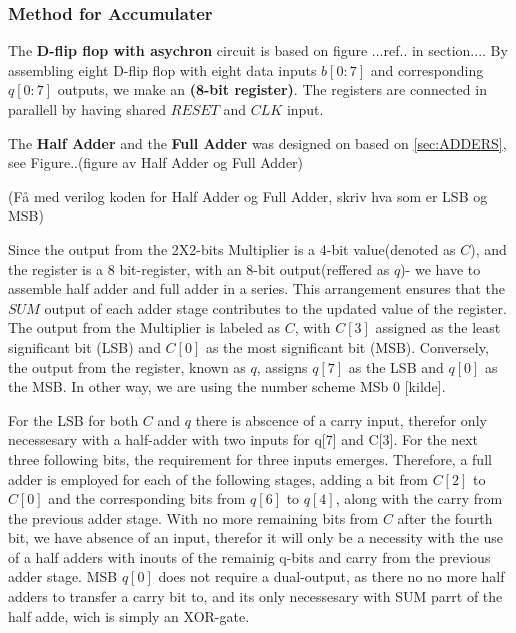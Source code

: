 \subsubsection{Method for Accumulater}

The \textbf{D-flip flop with asychron} circuit is based on figure ...ref.. in section.... By assembling eight D-flip flop with eight data inputs $b[0:7]$ and corresponding $q[0:7]$ outputs, we make an \textbf{(8-bit register)}. The registers are connected in parallell by having shared $RESET$ and $CLK$ input. 

The \textbf{Half Adder} and the \textbf{Full Adder} was designed on based on \ref{sec:ADDERS}, see Figure..(figure av Half Adder og Full Adder)

(Få med verilog koden for Half Adder og Full Adder, skriv hva som er LSB og MSB)



Since the output from the 2X2-bits Multiplier is a 4-bit value(denoted as $C$), and the register is a 8 bit-register, with an 8-bit output(reffered as $q$)- we have to assemble half adder and full adder in a series. This arrangement ensures that the $SUM$ output of each adder stage contributes to the updated value of the register. The output from the Multiplier is labeled as $C$, with $C[3]$ assigned as the least significant bit (LSB) and $C[0]$ as the most significant bit (MSB). Conversely, the output from the register, known as $q$, assigns $q[7]$ as the LSB and $q[0]$ as the MSB. In other way, we are using the number scheme MSb 0 [kilde].

For the LSB for both $C$ and $q$ there is abscence of a carry input, therefor only necessesary with a half-adder with two inputs for q[7] and C[3]. For the next three following bits, the requirement for three inputs emerges. Therefore, a full adder is employed for each of the following stages, adding a bit from $C[2]$ to $C[0]$ and the corresponding bits from $q[6]$ to $q[4]$, along with the carry from the previous adder stage. With no more remaining bits from $C$ after the fourth bit, we have absence of an input, therefor it will only be a necessity with the use of a half adders with inouts of the remainig q-bits and carry from the previous adder stage. MSB $q[0]$ does not require a dual-output, as there no no more half adders to transfer a carry bit to, and its only necessesary with SUM parrt of the half adde, wich is simply an XOR-gate.

 





